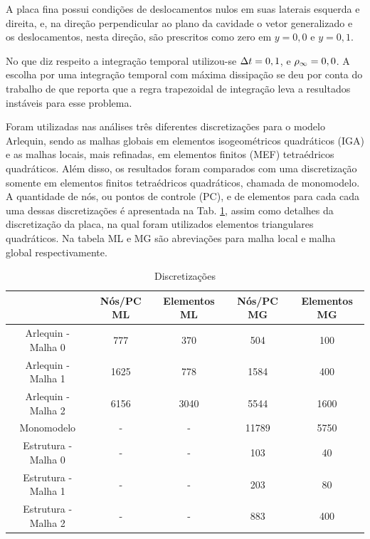 \documentclass[tese_patricia]{subfiles}
\begin{document}
A placa fina possui condições de deslocamentos nulos em suas laterais esquerda e direita, e, na direção perpendicular ao plano da cavidade o vetor generalizado e os deslocamentos, nesta direção, são prescritos como zero em $y=0,0$ e $y=0,1$.

No que diz respeito a integração temporal utilizou-se $\Delta t = 0,1$, e $\rho_\infty = 0,0$. A escolha por uma integração temporal com máxima dissipação se deu por conta do trabalho de  que reporta que a regra trapezoidal de integração leva a resultados instáveis para esse problema.

Foram utilizadas nas análises três diferentes discretizações para o modelo Arlequin, sendo as malhas globais em elementos isogeométricos quadráticos (IGA) e as malhas locais, mais refinadas, em elementos finitos (MEF) tetraédricos quadráticos. Além disso, os resultados foram comparados com uma discretização somente em elementos finitos tetraédricos quadráticos, chamada de monomodelo. A quantidade de nós, ou pontos de controle (PC), e de elementos para cada cada uma dessas discretizações é apresentada na Tab. \ref{tab:CF2DD}, assim como detalhes da discretização da placa, na qual foram utilizados elementos triangulares quadráticos. Na tabela ML e MG são abreviações para malha local e malha global respectivamente.
	
	\begin{center}
		\begin{table}[h!]
			\caption{Discretizações}
			\centering
			\begin{tabular}{|c | c | c| c| c|} 
				\hline
				\ &  Nós/PC ML & Elementos ML & Nós/PC MG & Elementos MG  \\ 
				\hline
				Arlequin - Malha 0 & 777 & 370 & 504 & 100 \\ 
				\hline
				Arlequin - Malha 1 & 1625 & 778 & 1584 & 400\\
				\hline
				Arlequin - Malha 2 & 6156 & 3040 & 5544 & 1600\\
				\hline
				Monomodelo & - & - & 11789 & 5750\\
				\hline
				Estrutura - Malha 0 & - & - &  103 & 40\\
				\hline
				Estrutura - Malha 1 & - & - &  203 & 80\\
				\hline
				Estrutura - Malha 2 & - & - &  883 & 400\\
				\hline
			\end{tabular}
			\label{tab:CF2DD}
		\end{table}
	\end{center}
\end{document}
